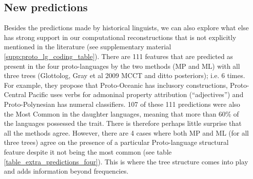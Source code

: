 \documentclass[12pt,letterpaper]{article}
\begin{document}
%

%
%
\FloatBarrier
\subsection{New predictions}
Besides the predictions made by historical linguists, we can also explore what else has strong support in our computational reconstructions that is not explicitly mentioned in the literature (see supplementary material \ref{supp:proto_lg_coding_table}). There are 111 features that are predicted as present in the four proto-languages by the two methods (MP and ML) with all three trees (Glottolog, Gray et al 2009 MCCT and ditto posteriors); i.e. 6 times. For example, they propose that Proto-Oceanic has inclusory constructions, Proto-Central Pacific uses verbs for admoninal property attribution (``adjectives'') and Proto-Polynesian has numeral classifiers. 107 of these 111 predictions were also the Most Common in the daughter languages, meaning that more than 60\% of the languages possessed the trait. There is therefore perhaps little surprise that all the methods agree. However, there are 4 cases where both MP and ML (for all three trees) agree on the presence of a particular Proto-language structural feature despite it not being the most common (see table \ref{table_extra_predictions_four}). This is where the tree structure comes into play and adds information beyond frequencies.
\end{document}
